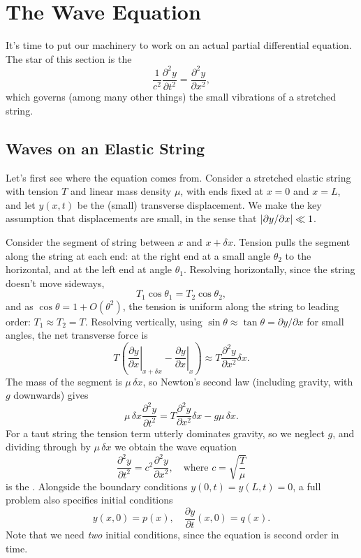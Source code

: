 \documentclass[a4paper]{scrartcl}
\begin{document}
\section{The Wave Equation}

It's time to put our machinery to work on an actual partial differential equation. The star of this section is the 
$$
\frac{1}{c^2} \frac{\partial^2 y}{\partial t^2} = \frac{\partial^2 y}{\partial x^2},
$$
which governs (among many other things) the small vibrations of a stretched string.

\subsection{Waves on an Elastic String}

Let's first see where the equation comes from. Consider a stretched elastic string with tension $T$ and linear mass density $\mu$, with ends fixed at $x = 0$ and $x = L$, and let $y(x, t)$ be the (small) transverse displacement. We make the key assumption that displacements are small, in the sense that $\lvert\partial y / \partial x\rvert \ll 1$.

Consider the segment of string between $x$ and $x + \delta x$. Tension pulls the segment along the string at each end: at the right end at a small angle $\theta_2$ to the horizontal, and at the left end at angle $\theta_1$.
Resolving horizontally, since the string doesn't move sideways,
$$
T_1 \cos \theta_1 = T_2 \cos \theta_2,
$$
and as $\cos \theta = 1 + O(\theta^2)$, the tension is uniform along the string to leading order: $T_1 \approx T_2 = T$.
Resolving vertically, using $\sin \theta \approx \tan \theta = \partial y/\partial x$ for small angles, the net transverse force is
$$
T \left(\left.\frac{\partial y}{\partial x}\right|_{x + \delta x} - \left.\frac{\partial y}{\partial x}\right|_x \right) \approx T \frac{\partial^2 y}{\partial x^2} \delta x.
$$
The mass of the segment is $\mu \, \delta x$, so Newton's second law (including gravity, with $g$ downwards) gives
$$
\mu \, \delta x \frac{\partial^2 y}{\partial t^2} = T \frac{\partial^2 y}{\partial x^2}\delta x - g \mu\, \delta x.
$$
For a taut string the tension term utterly dominates gravity, so we neglect $g$, and dividing through by $\mu \, \delta x$ we obtain the wave equation
$$
\frac{\partial^2 y}{\partial t^2} = c^2 \frac{\partial^2 y}{\partial x^2}, \quad \text{where } c = \sqrt{\frac{T}{\mu}}
$$
is the . Alongside the boundary conditions $y(0, t) = y(L, t) = 0$, a full problem also specifies initial conditions
$$
y(x, 0) = p(x), \quad \frac{\partial y}{\partial t}(x, 0) = q(x).
$$
Note that we need \emph{two} initial conditions, since the equation is second order in time.
\end{document}
